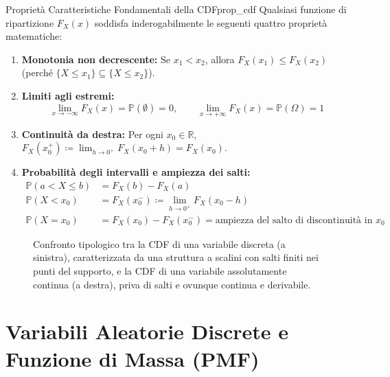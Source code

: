 \begin{teorema}{Proprietà Caratteristiche Fondamentali della CDF}{prop_cdf}
Qualsiasi funzione di ripartizione $F_X(x)$ soddisfa inderogabilmente le seguenti quattro proprietà matematiche:
\begin{enumerate}
    \item \textbf{Monotonia non decrescente:} Se $x_1 < x_2$, allora $F_X(x_1) \le F_X(x_2)$ (perché $\{X \le x_1\} \subseteq \{X \le x_2\}$).
    \item \textbf{Limiti agli estremi:}
    \begin{equation}
        \lim_{x \to -\infty} F_X(x) = \mathbb{P}(\emptyset) = 0, \qquad \lim_{x \to +\infty} F_X(x) = \mathbb{P}(\Omega) = 1
    \end{equation}
    \item \textbf{Continuità da destra:} Per ogni $x_0 \in \mathbb{R}$, $F_X(x_0^+) \coloneqq \lim_{h \to 0^+} F_X(x_0 + h) = F_X(x_0)$.
    \item \textbf{Probabilità degli intervalli e ampiezza dei salti:}
    \begin{align}
        \mathbb{P}(a < X \le b) &= F_X(b) - F_X(a) \\
        \mathbb{P}(X < x_0) &= F_X(x_0^-) \coloneqq \lim_{h \to 0^+} F_X(x_0 - h) \\
        \mathbb{P}(X = x_0) &= F_X(x_0) - F_X(x_0^-) = \text{ampiezza del salto di discontinuità in } x_0
    \end{align}
\end{enumerate}
\end{teorema}

\begin{figure}[htbp]
    \centering
    
    \caption{Confronto tipologico tra la CDF di una variabile discreta (a sinistra), caratterizzata da una struttura a scalini con salti finiti nei punti del supporto, e la CDF di una variabile assolutamente continua (a destra), priva di salti e ovunque continua e derivabile.}
    \label{fig:cdf_confronto}
\end{figure}

\section{Variabili Aleatorie Discrete e Funzione di Massa (PMF)}
\label{sec:va_discrete_pmf}

